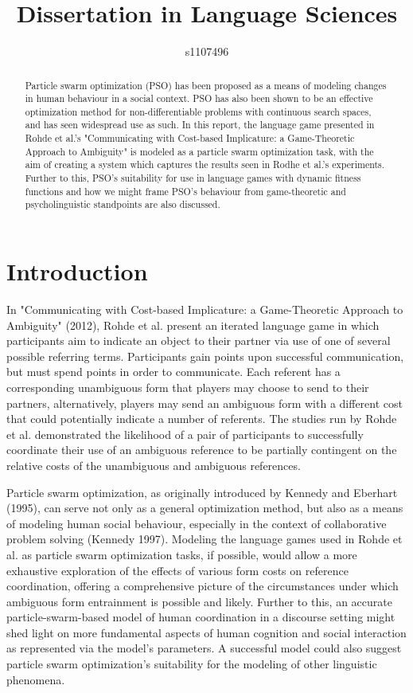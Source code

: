 \documentclass[12pt]{article}
\begin{document}
\title{Dissertation in Language Sciences}
\author{s1107496}

\maketitle

\begin{abstract}
Particle swarm optimization (PSO) has been proposed as a means of modeling changes in human behaviour in a social context. PSO has also been shown to be an effective optimization method for non-differentiable problems with continuous search spaces, and has seen widespread use as such. In this report, the language game presented in Rohde et al.'s "Communicating with Cost-based Implicature: a Game-Theoretic Approach to Ambiguity" is modeled as a particle swarm optimization task, with the aim of creating a system which captures the results seen in Rodhe et al.'s experiments. Further to this, PSO's suitability for use in language games with dynamic fitness functions and how we might frame PSO's behaviour from game-theoretic and psycholinguistic standpoints are also discussed.
\end{abstract}



\section{Introduction}
In "Communicating with Cost-based Implicature: a Game-Theoretic Approach to Ambiguity" (2012), Rohde et al. present an iterated language game in which participants aim to indicate an object to their partner via use of one of several possible referring terms. Participants gain points upon successful communication, but must spend points in order to communicate. Each referent has a corresponding unambiguous form that players may choose to send to
their partners, alternatively, players may send an ambiguous form with a different cost that could potentially indicate a number of referents. The 
studies run by Rohde et al. demonstrated the likelihood of a pair of participants to successfully coordinate their use of an ambiguous reference to be partially contingent on the relative costs of the unambiguous and ambiguous references.

Particle swarm optimization, as originally introduced by Kennedy and Eberhart (1995), can serve not only as a general optimization method, but also as a means of modeling human social behaviour, especially in the context of collaborative problem solving (Kennedy 1997). Modeling the language games used in Rohde et al. as particle swarm optimization tasks, if possible, would allow a more exhaustive exploration of the effects of various form costs on reference coordination, offering a comprehensive picture of the circumstances under which ambiguous form entrainment is possible and likely. Further to this, an accurate particle-swarm-based model of human coordination in a discourse setting might shed light on more fundamental aspects of human cognition and social interaction as represented via the model's parameters. A successful model could also suggest particle swarm optimization's suitability for the modeling of other linguistic phenomena. 
\end{document}
